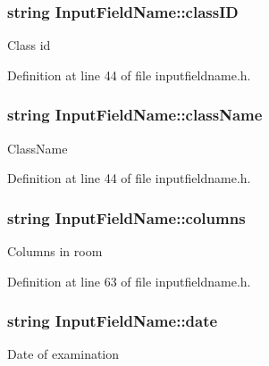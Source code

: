 \hypertarget{classInputFieldName_a6a67c361f3b631fb6c3620c14a615fb9}{
\subsubsection[{class\-I\-D}]{\setlength{\rightskip}{0pt plus 5cm}string Input\-Field\-Name\-::class\-I\-D}}\label{classInputFieldName_a6a67c361f3b631fb6c3620c14a615fb9}
Class id 

Definition at line 44 of file inputfieldname.\-h.

\hypertarget{classInputFieldName_ad8b28ebeabdabb5967542e317f549280}{
\subsubsection[{class\-Name}]{\setlength{\rightskip}{0pt plus 5cm}string Input\-Field\-Name\-::class\-Name}}\label{classInputFieldName_ad8b28ebeabdabb5967542e317f549280}
Class\-Name 

Definition at line 44 of file inputfieldname.\-h.

\hypertarget{classInputFieldName_abca049f347e589f24b672c19907c5c72}{
\subsubsection[{columns}]{\setlength{\rightskip}{0pt plus 5cm}string Input\-Field\-Name\-::columns}}\label{classInputFieldName_abca049f347e589f24b672c19907c5c72}
Columns in room 

Definition at line 63 of file inputfieldname.\-h.

\hypertarget{classInputFieldName_afb053a44abe76e108533e23902e90321}{
\subsubsection[{date}]{\setlength{\rightskip}{0pt plus 5cm}string Input\-Field\-Name\-::date}}\label{classInputFieldName_afb053a44abe76e108533e23902e90321}
Date of examination 

